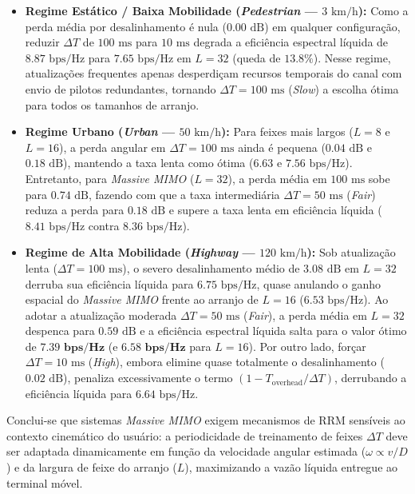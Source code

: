 \begin{itemize}
    \item \textbf{Regime Estático / Baixa Mobilidade (\textit{Pedestrian} — $3\text{ km/h}$):} Como a perda média por desalinhamento é nula ($0.00\text{ dB}$) em qualquer configuração, reduzir $\Delta T$ de $100\text{ ms}$ para $10\text{ ms}$ degrada a eficiência espectral líquida de $8.87\text{ bps/Hz}$ para $7.65\text{ bps/Hz}$ em $L=32$ (queda de $13.8\%$). Nesse regime, atualizações frequentes apenas desperdiçam recursos temporais do canal com envio de pilotos redundantes, tornando $\Delta T = 100\text{ ms}$ (\textit{Slow}) a escolha ótima para todos os tamanhos de arranjo.
    \item \textbf{Regime Urbano (\textit{Urban} — $50\text{ km/h}$):} Para feixes mais largos ($L=8$ e $L=16$), a perda angular em $\Delta T = 100\text{ ms}$ ainda é pequena ($0.04\text{ dB}$ e $0.18\text{ dB}$), mantendo a taxa lenta como ótima ($6.63$ e $7.56\text{ bps/Hz}$). Entretanto, para \textit{Massive MIMO} ($L=32$), a perda média em $100\text{ ms}$ sobe para $0.74\text{ dB}$, fazendo com que a taxa intermediária $\Delta T = 50\text{ ms}$ (\textit{Fair}) reduza a perda para $0.18\text{ dB}$ e supere a taxa lenta em eficiência líquida ($8.41\text{ bps/Hz}$ contra $8.36\text{ bps/Hz}$).
    \item \textbf{Regime de Alta Mobilidade (\textit{Highway} — $120\text{ km/h}$):} Sob atualização lenta ($\Delta T = 100\text{ ms}$), o severo desalinhamento médio de $3.08\text{ dB}$ em $L=32$ derruba sua eficiência líquida para $6.75\text{ bps/Hz}$, quase anulando o ganho espacial do \textit{Massive MIMO} frente ao arranjo de $L=16$ ($6.53\text{ bps/Hz}$). Ao adotar a atualização moderada $\Delta T = 50\text{ ms}$ (\textit{Fair}), a perda média em $L=32$ despenca para $0.59\text{ dB}$ e a eficiência espectral líquida salta para o valor ótimo de $\mathbf{7.39\text{ bps/Hz}}$ (e $\mathbf{6.58\text{ bps/Hz}}$ para $L=16$). Por outro lado, forçar $\Delta T = 10\text{ ms}$ (\textit{High}), embora elimine quase totalmente o desalinhamento ($0.02\text{ dB}$), penaliza excessivamente o termo $(1 - T_{\text{overhead}}/\Delta T)$, derrubando a eficiência líquida para $6.64\text{ bps/Hz}$.
\end{itemize}

Conclui-se que sistemas \textit{Massive MIMO} exigem mecanismos de RRM sensíveis ao contexto cinemático do usuário: a periodicidade de treinamento de feixes $\Delta T$ deve ser adaptada dinamicamente em função da velocidade angular estimada ($\omega \propto v/D$) e da largura de feixe do arranjo ($L$), maximizando a vazão líquida entregue ao terminal móvel.

